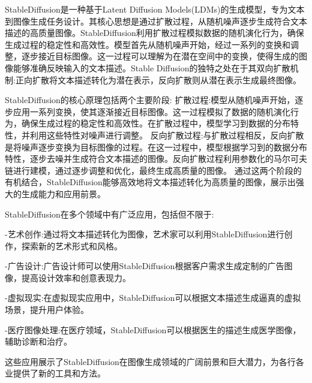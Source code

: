 StableDiffusion是一种基于Latent Diffusion Models(LDMs)的生成模型，专为文本到图像生成任务设计。其核心思想是通过扩散过程，从随机噪声逐步生成符合文本描述的高质量图像。StableDiffusion利用扩散过程模拟数据的随机演化行为，确保生成过程的稳定性和高效性。模型首先从随机噪声开始，经过一系列的变换和调整，逐步接近目标图像。这一过程可以理解为在潜在空间中的变换，使得生成的图像能够准确反映输入的文本描述。Stable Diffusion的独特之处在于其双向扩散机制:正向扩散将文本描述转化为潜在表示，反向扩散则从潜在表示生成最终图像。


StableDiffusion的核心原理包括两个主要阶段:
扩散过程:模型从随机噪声开始，逐步应用一系列变换，使其逐渐接近目标图像。这一过程模拟了数据的随机演化行为，确保生成过程的稳定性和高效性。在扩散过程中，模型学习到数据的分布特性，并利用这些特性对噪声进行调整。
反向扩散过程:与扩散过程相反，反向扩散是将噪声逐步变换为目标图像的过程。在这一过程中，模型根据学习到的数据分布特性，逐步去噪并生成符合文本描述的图像。反向扩散过程利用参数化的马尔可夫链进行建模，通过逐步调整和优化，最终生成高质量的图像。
通过这两个阶段的有机结合，StableDiffusion能够高效地将文本描述转化为高质量的图像，展示出强大的生成能力和应用前景。

StableDiffusion在多个领域中有广泛应用，包括但不限于:

-艺术创作:通过将文本描述转化为图像，艺术家可以利用StableDiffusion进行创作，探索新的艺术形式和风格。

-广告设计:广告设计师可以使用StableDiffusion根据客户需求生成定制的广告图像，提高设计效率和创意表现力。

-虚拟现实:在虚拟现实应用中，StableDiffusion可以根据文本描述生成逼真的虚拟场景，提升用户体验。

-医疗图像处理:在医疗领域，StableDiffusion可以根据医生的描述生成医学图像，辅助诊断和治疗。

这些应用展示了StableDiffusion在图像生成领域的广阔前景和巨大潜力，为各行各业提供了新的工具和方法。


